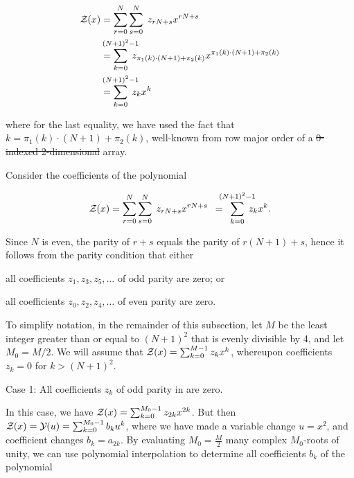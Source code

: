 \documentclass[11pt, oneside]{Thesis} %
\providecommand{\DIFadd}[1]{{\protect\color{blue}\uwave{#1}}} %
\providecommand{\DIFdel}[1]{{\protect\color{red}\sout{#1}}}                      %
\providecommand{\DIFaddbegin}{} %
\providecommand{\DIFaddend}{} %
\providecommand{\DIFdelbegin}{} %
\providecommand{\DIFdelend}{} %
\begin{document}
\begin{align}
\label{eq:ffttwo:polyRecEvenN}
\begin{split}
\fullZx &= \sum_{r=0}^{N} \sum_{s=0}^{N}\; z_{rN+s} x^{rN+s} \\
&=
\sum_{k=0}^{\mathclap{(N+1)^2-1}}\; z_{\pi_1(k)\cdot (N+1) + \pi_2(k)}
x^{\pi_1(k)\cdot (N+1) + \pi_2(k)} \\
&=
\sum_{k=0}^{\mathclap{(N+1)^2-1}}\; z_k x^k
\end{split}
\end{align}

where for the last equality, we have used the fact that
$k = \pi_1(k)\cdot (N+1)+\pi_2(k)$, well-known from
row major order of a \DIFdelbegin \DIFdel{0-indexed 2-dimensional }\DIFdelend \DIFaddbegin \DIFadd{$0$-indexed $2$-dimensional }\DIFaddend array.

Consider the coefficients of the polynomial

\begin{align}
\label{eq:ffttwo:zOfXEvenN}
\fullZx = \sum_{r=0}^{N} \sum_{s=0}^{N}\; z_{rN+s} x^{rN+s}
\enspace=\enspace\sum_{k=0}^{\mathclap{(N+1)^2-1}}\; z_k x^k.
\end{align}

Since $N$ is even, the parity of $r+s$ equals the parity of
$r(N+1)+s$, hence  it follows from the parity condition that either
\begin{inparaenum}[\em 1\upshape)]
\item all coefficients $z_1,z_3,z_5,\dots$ of odd parity are zero;
or \item all coefficients $z_0,z_2,z_4,\dots$ of even parity are zero.
\end{inparaenum}
To simplify notation, in the remainder of this subsection, let $M$ be
the least integer greater than or equal to $(N+1)^2$ that is evenly divisible
by 4, and let $M_0=M/2$. We will assume that ${\mathcal Z}_{}(x) = \sum_{k=0}^{M-1}
z_k x^k$, whereupon coefficients $z_k=0$ for $k>(N+1)^2$.

\medskip
{\sc Case 1}: All coefficients $z_k$ of odd parity in
 are zero.
\smallskip

In this case, we have
${\mathcal Z}_{}(x) = \sum_{k=0}^{M_0-1} z_{2k} x^{2k}$. But then
${\mathcal Z}_{}(x) = {\mathcal Y}_{}(u) = \sum_{k=0}^{M_0-1} b_k u^k$,
where we have made a variable change $u=x^2$, and coefficient changes
$b_k = a_{2k}$.
By evaluating $M_0=\frac{M}{2}$ many complex
$M_0$-roots of unity, we can
use polynomial interpolation to determine all coefficients $b_k$ of
the polynomial
\end{document}
